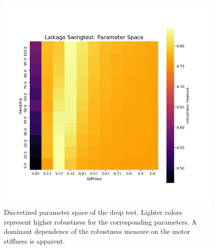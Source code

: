     \begin{figure}[h]
    \centering
    \includegraphics[width=.7\linewidth]{figures/swingtest_ps.png}
    \caption[Discretized Parameter Space, Swing Test]{Discretized parameter space of the drop test. Lighter colors represent higher robustness for the corresponding parameters. A dominant dependence of the robustness measure on the motor stiffness is apparent.}
    \label{fig:swingps}
    \end{figure}    

